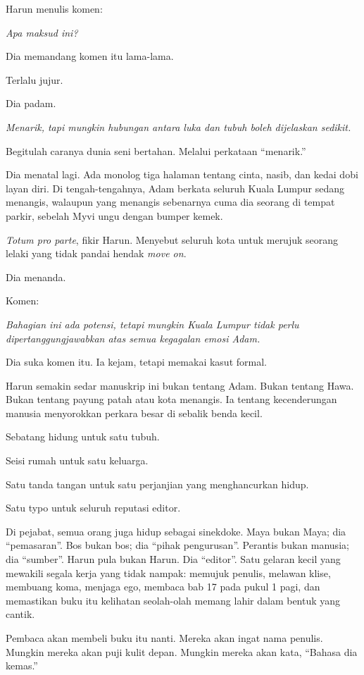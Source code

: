 \documentclass[
  11pt,
  a5paper,
  openany,
  oneside]{book}
\begin{document}
Harun menulis komen:

\emph{Apa maksud ini?}

Dia memandang komen itu lama-lama.

Terlalu jujur.

Dia padam.

\emph{Menarik, tapi mungkin hubungan antara luka dan tubuh boleh
dijelaskan sedikit.}

Begitulah caranya dunia seni bertahan. Melalui perkataan ``menarik.''

Dia menatal lagi. Ada monolog tiga halaman tentang cinta, nasib, dan
kedai dobi layan diri. Di tengah-tengahnya, Adam berkata seluruh Kuala
Lumpur sedang menangis, walaupun yang menangis sebenarnya cuma dia
seorang di tempat parkir, sebelah Myvi ungu dengan bumper kemek.

\emph{Totum pro parte}, fikir Harun. Menyebut seluruh kota untuk merujuk
seorang lelaki yang tidak pandai hendak \emph{move on}.

Dia menanda.

Komen:

\emph{Bahagian ini ada potensi, tetapi mungkin Kuala Lumpur tidak perlu
dipertanggungjawabkan atas semua kegagalan emosi Adam.}

Dia suka komen itu. Ia kejam, tetapi memakai kasut formal.

Harun semakin sedar manuskrip ini bukan tentang Adam. Bukan tentang
Hawa. Bukan tentang payung patah atau kota menangis. Ia tentang
kecenderungan manusia menyorokkan perkara besar di sebalik benda kecil.

Sebatang hidung untuk satu tubuh.

Seisi rumah untuk satu keluarga.

Satu tanda tangan untuk satu perjanjian yang menghancurkan hidup.

Satu typo untuk seluruh reputasi editor.

Di pejabat, semua orang juga hidup sebagai sinekdoke. Maya bukan Maya;
dia ``pemasaran''. Bos bukan bos; dia ``pihak pengurusan''. Perantis
bukan manusia; dia ``sumber''. Harun pula bukan Harun. Dia ``editor''.
Satu gelaran kecil yang mewakili segala kerja yang tidak nampak: memujuk
penulis, melawan klise, membuang koma, menjaga ego, membaca bab 17 pada
pukul 1 pagi, dan memastikan buku itu kelihatan seolah-olah memang lahir
dalam bentuk yang cantik.

Pembaca akan membeli buku itu nanti. Mereka akan ingat nama penulis.
Mungkin mereka akan puji kulit depan. Mungkin mereka akan kata, ``Bahasa
dia kemas.''
\end{document}
